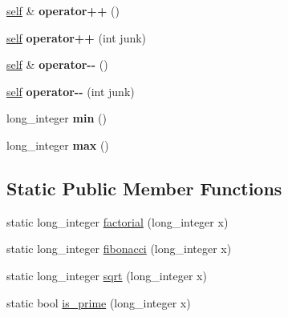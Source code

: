 \begin{DoxyCompactItemize}
\hyperlink{classez_1_1objects_1_1LongInteger}{self} \& {\bfseries operator++} ()
\item 
\mbox{\label{classez_1_1objects_1_1LongInteger_a46ffc0a602e001c7fc9fbb04aac79322}} 
\hyperlink{classez_1_1objects_1_1LongInteger}{self} {\bfseries operator++} (int junk)
\item 
\mbox{\label{classez_1_1objects_1_1LongInteger_a44983751c9623ba9b9be762b050ebba9}} 
\hyperlink{classez_1_1objects_1_1LongInteger}{self} \& {\bfseries operator-\/-\/} ()
\item 
\mbox{\label{classez_1_1objects_1_1LongInteger_af01529a771f55ad20575e06aa6876303}} 
\hyperlink{classez_1_1objects_1_1LongInteger}{self} {\bfseries operator-\/-\/} (int junk)
\item 
\mbox{\label{classez_1_1objects_1_1LongInteger_a21623d2785230d246f502747cbe085b6}} 
long\+\_\+integer {\bfseries min} ()
\item 
\mbox{\label{classez_1_1objects_1_1LongInteger_aca0bd81656855177176e11638ab8a253}} 
long\+\_\+integer {\bfseries max} ()
\end{DoxyCompactItemize}
\subsection*{Static Public Member Functions}
\begin{DoxyCompactItemize}
\item 
static long\+\_\+integer \hyperlink{classez_1_1objects_1_1LongInteger_a555e78bdf1c29fef8784e2e80ba97524}{factorial} (long\+\_\+integer x)
\item 
static long\+\_\+integer \hyperlink{classez_1_1objects_1_1LongInteger_a38a5c03d9a76cb536e5ae5a4032f49bf}{fibonacci} (long\+\_\+integer x)
\item 
static long\+\_\+integer \hyperlink{classez_1_1objects_1_1LongInteger_abd2d5eb5775cb31b475d7dd20972cfc5}{sqrt} (long\+\_\+integer x)
\item 
static bool \hyperlink{classez_1_1objects_1_1LongInteger_a7794d4a28648c4b1a4793f0498567fe3}{is\+\_\+prime} (long\+\_\+integer x)
\end{DoxyCompactItemize}
